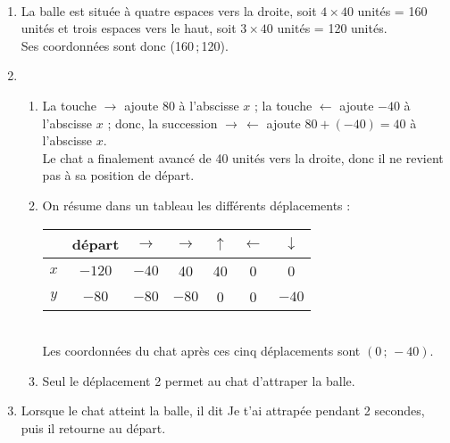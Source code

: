 \begin{colonne*exercice}
\begin{corrige}
   \ \\ [-5mm]
   \begin{enumerate}
      \item La balle est située à quatre espaces vers la droite, soit $4\times40$ unités = 160 unités et trois espaces vers le haut, soit $3\times40$ unités = 120 unités. \\
      Ses coordonnées sont donc {\blue (160\,;\,120)}.
      \item \\
      \begin{enumerate}
         \item La touche $\to$ ajoute 80 à l'abscisse $x$ ; la touche $\gets$ ajoute $-40$ à l'abscisse $x$ ; donc, la succession $\to \, \gets$ ajoute $80+(-40) =40$ à l'abscisse $x$. \\
         Le chat a finalement \og avancé \fg{} de 40 unités vers la droite, donc {\blue il ne revient pas à sa position de départ}. 
         \item On résume dans un tableau les différents déplacements : \\ \smallskip
            {
            \begin{tabular}{|*{7}{c|}}
               \hline
               & départ & $\to$ & $\to$ & $\uparrow$ & $\gets$ & $\downarrow$ \\
               \hline
               $x$ & $-120$ & $-40$ & 40 & 40 & 0 & 0 \\
               \hline 
               $y$ & $-80$ & $-80$ & $-80$ & 0 & 0 & $-40$ \\
               \hline
            \end{tabular}} \\ \smallskip
         Les coordonnées du chat après ces cinq déplacements sont {\blue $(0\,;\,-40)$}.
         \item Seul le {\blue déplacement 2} permet au chat d'attraper la balle.
      \end{enumerate}
      \setcounter{enumi}{2}
      \item Lorsque le chat atteint la balle, {\blue il dit \og Je t'ai attrapée \fg{} pendant 2 secondes}, puis il retourne au départ. 
   \end{enumerate}
\end{corrige}



\end{colonne*exercice}
